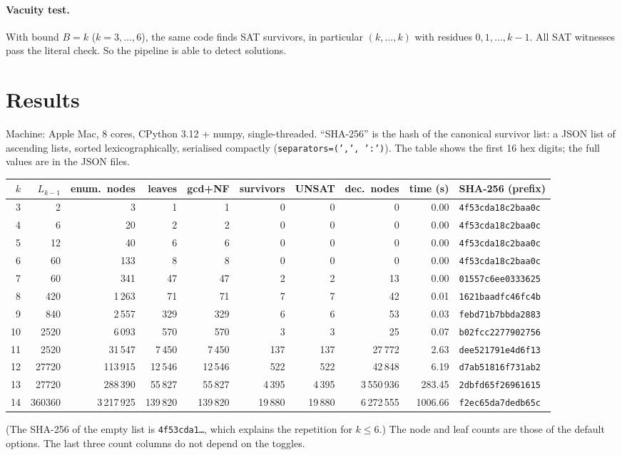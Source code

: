 \documentclass[11pt]{article}
\theoremstyle{definition}
\theoremstyle{remark}
\begin{document}
\paragraph{Vacuity test.}
With bound $B=k$ ($k=3,\dots,6$), the same code finds SAT survivors, in particular $(k,\dots,k)$
with residues $0,1,\dots,k-1$. All SAT witnesses pass the literal check. So the pipeline is able
to detect solutions.

\section{Results}\label{sec:res}

Machine: Apple Mac, 8 cores, CPython 3.12 + numpy, single-threaded. ``SHA-256'' is the hash of the
canonical survivor list: a JSON list of ascending lists, sorted lexicographically, serialised
compactly (\texttt{separators=(',', ':')}). The table shows the first 16 hex digits; the full
values are in the JSON files.

\begin{center}\small
\begin{tabular}{rrrrrrrrrl}
\toprule
$k$ & $L_{k-1}$ & enum.\ nodes & leaves & gcd+NF & survivors & UNSAT & dec.\ nodes & time (s) & SHA-256 (prefix)\\
\midrule
3 & 2 & 3 & 1 & 1 & 0 & 0 & 0 & 0.00 & \texttt{4f53cda18c2baa0c}\\
4 & 6 & 20 & 2 & 2 & 0 & 0 & 0 & 0.00 & \texttt{4f53cda18c2baa0c}\\
5 & 12 & 40 & 6 & 6 & 0 & 0 & 0 & 0.00 & \texttt{4f53cda18c2baa0c}\\
6 & 60 & 133 & 8 & 8 & 0 & 0 & 0 & 0.00 & \texttt{4f53cda18c2baa0c}\\
7 & 60 & 341 & 47 & 47 & 2 & 2 & 13 & 0.00 & \texttt{01557c6ee0333625}\\
8 & 420 & 1\,263 & 71 & 71 & 7 & 7 & 42 & 0.01 & \texttt{1621baadfc46fc4b}\\
9 & 840 & 2\,557 & 329 & 329 & 6 & 6 & 53 & 0.03 & \texttt{febd71b7bbda2883}\\
10 & 2520 & 6\,093 & 570 & 570 & 3 & 3 & 25 & 0.07 & \texttt{b02fcc2277902756}\\
11 & 2520 & 31\,547 & 7\,450 & 7\,450 & 137 & 137 & 27\,772 & 2.63 & \texttt{dee521791e4d6f13}\\
12 & 27720 & 113\,915 & 12\,546 & 12\,546 & 522 & 522 & 42\,848 & 6.19 & \texttt{d7ab51816f731ab2}\\
\midrule
13 & 27720 & 288\,390 & 55\,827 & 55\,827 & 4\,395 & 4\,395 & 3\,550\,936 & 283.45 & \texttt{2dbfd65f26961615}\\
14 & 360360 & 3\,217\,925 & 139\,820 & 139\,820 & 19\,880 & 19\,880 & 6\,272\,555 & 1006.66 & \texttt{f2ec65da7dedb65c}\\
\bottomrule
\end{tabular}
\end{center}
(The SHA-256 of the empty list is \texttt{4f53cda1\dots}, which explains the repetition for
$k\le6$.) The node and leaf counts are those of the default options. The last three count
columns do not depend on the toggles.
\end{document}
